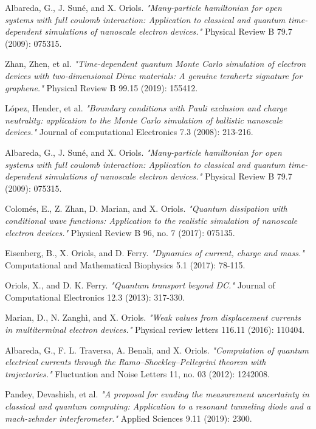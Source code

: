 \documentclass[11pt, a4paper]{article} %
\begin{document}
\begin{thebibliography}{1}
{
Albareda, G., J. Suné, and X. Oriols. {\em "Many-particle hamiltonian for open systems with full coulomb interaction: Application to classical and quantum time-dependent simulations of nanoscale electron devices."} Physical Review B 79.7 (2009): 075315.

Zhan, Zhen, et al. {\em "Time-dependent quantum Monte Carlo simulation of electron devices with two-dimensional Dirac materials: A genuine terahertz signature for graphene."} Physical Review B 99.15 (2019): 155412.

López, Hender, et al. {\em "Boundary conditions with Pauli exclusion and charge neutrality: application to the Monte Carlo simulation of ballistic nanoscale devices."} Journal of computational Electronics 7.3 (2008): 213-216.

Albareda, G., J. Suné, and X. Oriols. {\em "Many-particle hamiltonian for open systems with full coulomb interaction: Application to classical and quantum time-dependent simulations of nanoscale electron devices."} Physical Review B 79.7 (2009): 075315.

Colomés, E., Z. Zhan, D. Marian, and X. Oriols. {\em "Quantum dissipation with conditional wave functions: Application to the realistic simulation of nanoscale electron devices."} Physical Review B 96, no. 7 (2017): 075135.

Eisenberg, B., X. Oriols, and D. Ferry. {\em "Dynamics of current, charge and mass."} Computational and Mathematical Biophysics 5.1 (2017): 78-115.

Oriols, X., and D. K. Ferry. {\em "Quantum transport beyond DC."} Journal of Computational Electronics 12.3 (2013): 317-330.

Marian, D., N. Zanghì, and X. Oriols. {\em "Weak values from displacement currents in multiterminal electron devices."} Physical review letters 116.11 (2016): 110404.

Albareda, G., F. L. Traversa, A. Benali, and X. Oriols. {\em "Computation of quantum electrical currents through the Ramo–Shockley–Pellegrini theorem with trajectories."} Fluctuation and Noise Letters 11, no. 03 (2012): 1242008.

Pandey, Devashish, et al. {\em "A proposal for evading the measurement uncertainty in classical and quantum computing: Application to a resonant tunneling diode and a mach-zehnder interferometer."} Applied Sciences 9.11 (2019): 2300.

}
\end{thebibliography}
\end{document}
